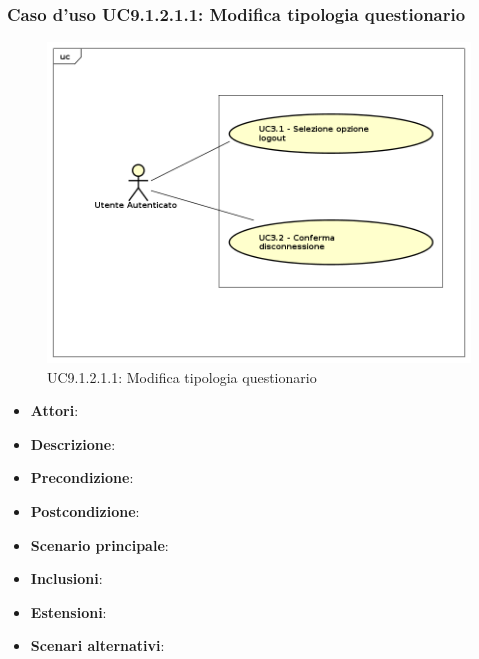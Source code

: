 					\subsubsection{Caso d'uso UC9.1.2.1.1: Modifica tipologia questionario}
					\label{UC9.1.2.1.1}
					\begin{figure}[h]
						\centering
					\includegraphics[scale=0.7,keepaspectratio]{UML/UC9.png}
						\caption{UC9.1.2.1.1: Modifica tipologia questionario}
					\end{figure}
					\FloatBarrier
					\begin{itemize}
						\item \textbf{Attori}: 
						\item \textbf{Descrizione}: 
						\item \textbf{Precondizione}: 
						\item \textbf{Postcondizione}: 
						\item \textbf{Scenario principale}:
						\item \textbf{Inclusioni}:
						\item \textbf{Estensioni}:
						\item \textbf{Scenari alternativi}:
					\end{itemize}
					
